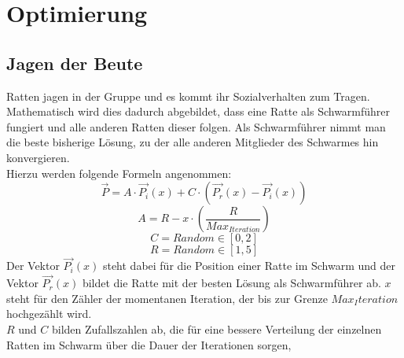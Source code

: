 \chapter{Optimierung}
\section{Jagen der Beute}
Ratten jagen in der Gruppe und es kommt ihr Sozialverhalten zum Tragen. Mathematisch wird dies dadurch abgebildet, dass eine Ratte als Schwarmführer fungiert und alle anderen Ratten dieser folgen. Als Schwarmführer nimmt man die beste bisherige Lösung, zu der alle anderen Mitglieder des Schwarmes hin konvergieren. \\
Hierzu werden folgende Formeln angenommen: 
\begin{equation}
    \vec{P} = A \cdot \vec{P_i}(x) + C \cdot (\vec{P_r}(x) - \vec{P_i}(x))
    \label{calcP}
\end{equation}
\begin{equation}
    A = R-x \cdot (\frac{R}{Max_{Iteration}})
    \label{calcA}
\end{equation}
\begin{equation}
    C = Random \in [0,2]
    \label{calcC}
\end{equation}
\begin{equation}
    R = Random \in [1,5]
    \label{calcR}
\end{equation}
Der Vektor $\vec{P_i}(x)$ steht dabei für die Position einer Ratte im Schwarm und der Vektor $\vec{P_r}(x)$ bildet die Ratte mit der besten Lösung als Schwarmführer ab. $x$ steht für den Zähler der momentanen Iteration, der bis zur Grenze $Max_Iteration$ hochgezählt wird. \\
$R$ und $C$ bilden Zufallszahlen ab, die für eine bessere Verteilung der einzelnen Ratten im Schwarm über die Dauer der Iterationen sorgen, \cite[vgl. Gaurav Dhiman, S.3]{dhiman_garg_nagar_kumar_dehghani_2020}

